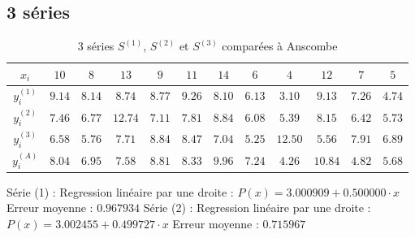 \documentclass{report}
\begin{document}
      \subsection{3 séries}
	\begin{table}[h]
	  \centering
	  \begin{tabular}{| c | c | c | c | c | c | c | c | c | c | c | c |}
	    \hline 
	    $x_{i}$ & $10$ & $8$ & $13$ & $9$ & $11$ & $14$ & $6$ & $4$ & $12$ & $7$ & $5$ \\ 
	    \hline 
	    $y^{(1)}_{i}$ & $9.14$ & $8.14$ & $8.74$ & $8.77$ & $9.26$ & $8.10$ & $6.13$ & $3.10$ & $9.13$ & $7.26$ & $4.74$ \\ %
	    \hline 
	    $y^{(2)}_{i}$ & $7.46$ & $6.77$ & $12.74$ & $7.11$ & $7.81$ & $8.84$ & $6.08$ & $5.39$ & $8.15$ & $6.42$ & $5.73$ \\ %
	    \hline 
	    $y^{(3)}_{i}$ & $6.58$ & $5.76$ & $7.71$ & $8.84$ & $8.47$ & $7.04$ & $5.25$ & $12.50$ & $5.56$ & $7.91$ & $6.89$ \\ %
	    \hline 
	    $y^{(A)}_{i}$ & $8.04$ & $6.95$ & $7.58$ & $8.81$ & $8.33$ & $9.96$ & $7.24$ & $4.26$ & $10.84$ & $4.82$ & $5.68$ \\ %
	    \hline 
	  \end{tabular}
	  \caption{3 séries $S^{(1)}$, $S^{(2)}$ et $S^{(3)}$ comparées à Anscombe}
	  \label{approx_tp2_ex2}
	\end{table}
	Série (1) :
	\newline
	Regression linéaire par une droite : $P(x) = 3.000909 + 0.500000 \cdot x$
	\newline
	Erreur moyenne : $0.967934$
	\newline
	\newline
	Série (2) :
	\newline
	Regression linéaire par une droite : $P(x) = 3.002455 + 0.499727 \cdot x$
	\newline
	Erreur moyenne : $0.715967$
	
\end{document}
